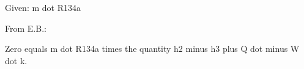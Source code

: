 Given: m dot R134a

From E.B.:

Zero equals m dot R134a times the quantity h2 minus h3 plus Q dot minus W dot k.